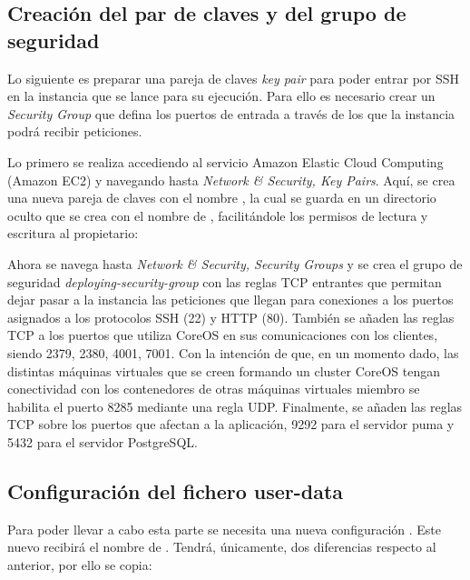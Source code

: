 \subsection{Creación del par de claves y del grupo de seguridad}

Lo siguiente es preparar una pareja de claves \textit{key pair} para poder entrar por SSH en la instancia que se lance para su ejecución. Para ello es necesario crear un \textit{Security Group} que defina los puertos de entrada a través de los que la instancia podrá recibir peticiones.

Lo primero se realiza accediendo al servicio Amazon Elastic Cloud Computing (Amazon EC2) y navegando hasta \textit{Network \& Security, Key Pairs}. Aquí, se crea una nueva pareja de claves con el nombre , la cual se guarda en un directorio oculto que se crea con el nombre de , facilitándole los permisos de lectura y escritura al propietario:


Ahora se navega hasta \textit{Network \& Security, Security Groups} y se crea el grupo de seguridad \textit{deploying-security-group} con las reglas TCP entrantes que permitan dejar pasar a la instancia las peticiones que llegan para conexiones a los puertos asignados a los protocolos SSH (22) y HTTP (80). También se añaden las reglas TCP a los puertos que utiliza CoreOS en sus comunicaciones con los clientes, siendo 2379, 2380, 4001, 7001. Con la intención de que, en un momento dado, las distintas máquinas virtuales que se creen formando un cluster CoreOS tengan conectividad con los contenedores de otras máquinas virtuales miembro se habilita el puerto 8285 mediante una regla UDP. Finalmente, se añaden las reglas TCP sobre los puertos que afectan a la aplicación, 9292 para el servidor puma y 5432 para el servidor PostgreSQL.

\subsection{Configuración del fichero user-data}

Para poder llevar a cabo esta parte se necesita una nueva configuración . Este nuevo  recibirá el nombre de . Tendrá, únicamente, dos diferencias respecto al anterior, por ello se copia:

